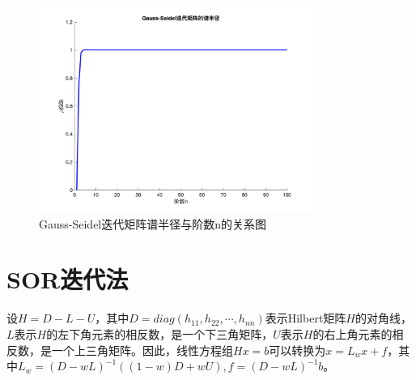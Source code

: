 \documentclass[a4paper]{article}
\begin{document}
\begin{figure}[!h]
	\centering
	\includegraphics[width=0.8\textwidth]{../code/result/gsrho}
	\caption{\label{fig:6}Gauss-Seidel迭代矩阵谱半径与阶数n的关系图}
\end{figure}

\section{SOR迭代法}
设$H=D-L-U$，其中$D=diag(h_{11},h_{22},\cdots,h_{nn})$表示Hilbert矩阵$H$的对角线，$L$表示$H$的左下角元素的相反数，是一个下三角矩阵，$U$表示$H$的右上角元素的相反数，是一个上三角矩阵。因此，线性方程组$Hx=b$可以转换为$x=L_wx+f$，其中$L_w=(D-wL)^{-1}((1-w)D+wU),f=(D-wL)^{-1}b$。
\end{document}

